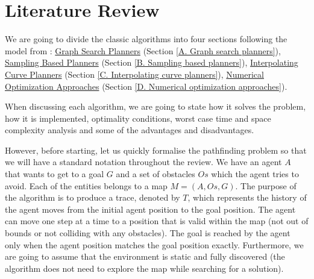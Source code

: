 \chapter{Literature Review} \label{LiteratureReview}
We are going to divide the classic algorithms into four sections following the model from \cite{gonzalez2016review}: \hyperref[A. Graph search planners]{Graph Search Planners} (Section \ref{A. Graph search planners}), \hyperref[B. Sampling based planners]{Sampling Based Planners} (Section \ref{B. Sampling based planners}), \hyperref[C. Interpolating curve planners]{Interpolating Curve Planners} (Section \ref{C. Interpolating curve planners}), \hyperref[D. Numerical optimization approaches]{Numerical Optimization Approaches} (Section \ref{D. Numerical optimization approaches}).

When discussing each algorithm, we are going to state how it solves the problem, how it is implemented, optimality conditions, worst case time and space complexity analysis and some of the advantages and disadvantages.


However, before starting, let us quickly formalise the pathfinding problem so that we will have a standard notation throughout the review. We have an agent $A$ that wants to get to a goal $G$ and a set of obstacles $Os$ which the agent tries to avoid. Each of the entities belongs to a map $M=(A, Os, G)$. The purpose of the algorithm is to produce a trace, denoted by $T$, which represents the history of the agent moves from the initial agent position to the goal position. The agent can move one step at a time to a position that is valid within the map (not out of bounds or not colliding with any obstacles). The goal is reached by the agent only when the agent position matches the goal position exactly. Furthermore, we are going to assume that the environment is static and fully discovered (the algorithm does not need to explore the map while searching for a solution).

